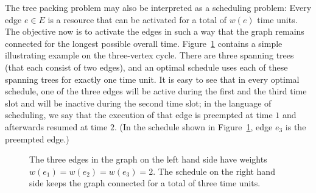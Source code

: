 The tree packing problem may also be interpreted as a scheduling problem:
Every edge $e\in E$ is a resource that can be activated for a total of $w(e)$ time units.
The objective now is to activate the edges in such a way that the graph remains connected 
for the longest possible overall time. 
Figure~\ref{fig:example} contains a simple illustrating example on the three-vertex cycle.
There are three spanning trees (that each consist of two edges), and an optimal schedule 
uses each of these spanning trees for exactly one time unit.
It is easy to see that in every optimal schedule, one of the three edges will be active 
during the first and the third time slot and will be inactive during the second time slot;
in the language of scheduling, we say that the execution of that edge is preempted 
at time $1$ and afterwards resumed at time $2$.
(In the schedule shown in Figure~\ref{fig:example}, edge $e_3$ is the preempted edge.)

\begin{figure}[tbh]
\begin{center}
\qquad\qquad
\end{center}
\caption{The three edges in the graph on the left hand side have weights $w(e_1)=w(e_2)=w(e_3)=2$.
The schedule on the right hand side keeps the graph connected for a total of three time units.}
\label{fig:example}

\vspace{-0.8cm}
\end{figure}

